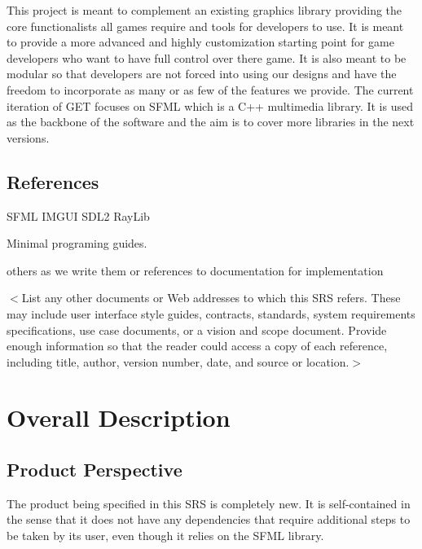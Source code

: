 \documentclass{scrreprt}
\begin{document}
This project is meant to complement an existing graphics library providing the core functionalists all games require and tools for developers to use.  It is meant to provide a more advanced and highly customization starting point for game developers who want to have full control over there game.  It is also meant to be modular so that developers are not forced into using our designs and have the freedom to incorporate as many or as few of the features we provide. The current iteration of GET focuses on SFML which is a C++ multimedia library. It is used as the backbone of the software and the aim is to cover more libraries in the next versions.


\section{References}

SFML 
IMGUI
SDL2
RayLib

Minimal programing guides. 

others as we write them or references to documentation for implementation

$<$List any other documents or Web addresses to which this SRS refers. These may 
include user interface style guides, contracts, standards, system requirements 
specifications, use case documents, or a vision and scope document. Provide 
enough information so that the reader could access a copy of each reference, 
including title, author, version number, date, and source or location.$>$


\chapter{Overall Description}

\section{Product Perspective}

The product being specified in this SRS is completely new. It is self-contained in the sense that it does not have any dependencies that require additional steps to be taken by its user, even though it relies on the SFML library.
\end{document}

